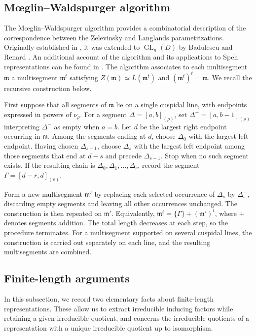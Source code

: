 \documentclass[11pt,leqno]{amsart}
\numberwithin{equation}{section}
\theoremstyle{plain}
\theoremstyle{definition}
\theoremstyle{remark}
\DeclareMathOperator{\GL}{GL}
\begin{document}
	\subsection{M\oe glin--Waldspurger algorithm} 
	The M\oe glin--Waldspurger algorithm provides a combinatorial
	description of the correspondence between the Zelevinsky and
	Langlands parametrizations. Originally established in
	\cite{MW86}, it was extended to $\GL_n(D)$ by Badulescu and
	Renard \cite{BR07}. An additional account of the algorithm
	and its applications to Speh representations can be found
	in \cite{Ba14}.
	The algorithm associates to each multisegment $\mathfrak m$
	a multisegment $\mathfrak m^t$ satisfying
	$Z(\mathfrak m)\simeq L(\mathfrak m^t)$ and $(\mathfrak m^t)^t=\mathfrak m$.
	We recall the recursive construction below.
	
	First suppose that all segments of $\mathfrak m$ lie on
	a single cuspidal line, with endpoints expressed in powers
	of $\nu_\rho$. 
	For a segment $\Delta=[a,b]_{(\rho)}$, set $\Delta^-=[a,b-1]_{(\rho)}$
	interpreting $\Delta^-$ as empty when $a=b$.
	Let $d$ be the largest right endpoint occurring in
	$\mathfrak m$. Among the segments ending at $d$, choose
	$\Delta_0$ with the largest left endpoint. 
	Having chosen $\Delta_{s-1}$, choose $\Delta_s$ with the largest left
	endpoint among those segments that end at $d-s$ and
	precede $\Delta_{s-1}$. Stop when no such segment exists.
	If the resulting chain is
	$\Delta_0,\Delta_1,\ldots,\Delta_r$,
	record the segment $\Gamma=[d-r,d]_{(\rho)}$.
	
	Form a new multisegment $\mathfrak m'$ by replacing each
	selected occurrence of $\Delta_s$ by $\Delta_s^-$,
	discarding empty segments and leaving all other occurrences
	unchanged. The construction is then repeated on
	$\mathfrak m'$. Equivalently,
	$\mathfrak m^t=\{\Gamma\}+(\mathfrak m')^t$, 
	where $+$ denotes segments addition.
	The total length decreases at each step, so the procedure
	terminates. 
	For a multisegment supported on several cuspidal
	lines, the construction is carried out separately on each
	line, and the resulting multisegments are combined.
	
	
	\subsection{Finite-length arguments}
	In this subsection, we record two elementary facts about finite-length representations.
	These allow us to extract irreducible inducing factors while
	retaining a given irreducible quotient, and concerns the irreducible
	quotients of a representation with a unique irreducible quotient
	up to isomorphism.
	
\end{document}
